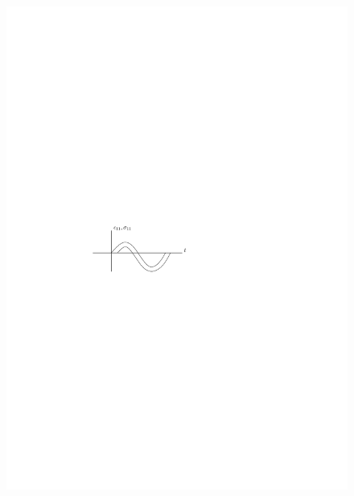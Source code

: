\documentclass[a4paper, 12pt]{article}
\begin{document}
\begin{itemize}
		\begin{figure}[H]
			\includegraphics[scale=1.3]{images/elast}

\end{figure}
\end{itemize}
\end{document}
